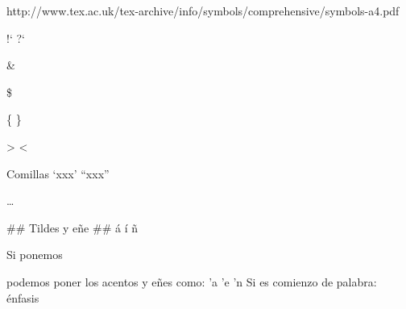 http://www.tex.ac.uk/tex-archive/info/symbols/comprehensive/symbols-a4.pdf

\textexclamdown %
!` %
\textquestiondown %
?` %

\& %

\$ %

\{ %
\} %

\textgreater %
\textless %

\geneuro %

Comillas
`xxx' %
``xxx'' %

\ldots %

## Tildes y eñe ##
\'a %
\'i %
\~n %

Si ponemos 
\usepackage[spanish,activeacute]{babel}
podemos poner los acentos y eñes como:
'a
'e
'n
Si es comienzo de palabra: \'enfasis
